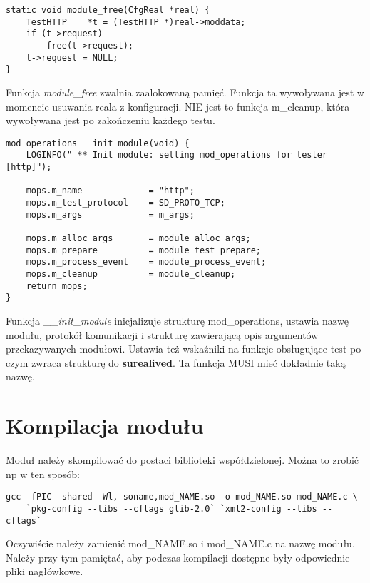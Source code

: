 \documentclass[polish,12pt]{article}
\begin{document}
\begin{verbatim}
static void module_free(CfgReal *real) {
    TestHTTP    *t = (TestHTTP *)real->moddata;
    if (t->request)
        free(t->request);
    t->request = NULL;
}
\end{verbatim}
Funkcja \textit{module\_free} zwalnia zaalokowaną pamięć. Funkcja ta wywoływana jest
w momencie usuwania reala z konfiguracji. NIE jest to funkcja m\_cleanup, która wywoływana
jest po zakończeniu każdego testu.
\newpage
{\small
\begin{verbatim}
mod_operations __init_module(void) {
    LOGINFO(" ** Init module: setting mod_operations for tester [http]");

    mops.m_name             = "http";
    mops.m_test_protocol    = SD_PROTO_TCP;
    mops.m_args             = m_args;

    mops.m_alloc_args       = module_alloc_args;
    mops.m_prepare          = module_test_prepare;
    mops.m_process_event    = module_process_event;
    mops.m_cleanup          = module_cleanup;
    return mops;
}
\end{verbatim}
}
Funkcja \textit{\_\_init\_module} inicjalizuje strukturę mod\_operations,
ustawia nazwę modułu, protokół komunikacji i strukturę zawierającą opis
argumentów przekazywanych modułowi. Ustawia też wskaźniki na funkcje obsługujące test
po czym zwraca strukturę do \textbf{surealived}.
Ta funkcja MUSI mieć dokładnie taką nazwę.

\section{Kompilacja modułu}
Moduł należy skompilować do postaci biblioteki współdzielonej. Można to zrobić np w ten sposób:
\begin{verbatim}
gcc -fPIC -shared -Wl,-soname,mod_NAME.so -o mod_NAME.so mod_NAME.c \
    `pkg-config --libs --cflags glib-2.0` `xml2-config --libs --cflags`
\end{verbatim}
Oczywiście należy zamienić mod\_NAME.so i mod\_NAME.c na nazwę modułu.
Należy przy tym pamiętać, aby podczas kompilacji dostępne były odpowiednie pliki nagłówkowe.
\end{document}
